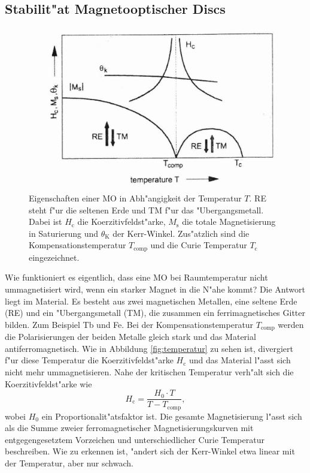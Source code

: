 \subsection{Stabilit"at Magnetooptischer Discs}
\begin{figure}[htbp]
    \begin{minipage}[t][][b]{0.48\textwidth}
        \centering
        \includegraphics[width=\textwidth]{../images/temperatur.png}
    \end{minipage}
    \hfill
    \begin{minipage}[t][][t]{0.48\textwidth}
        \caption{
            Eigenschaften einer MO in Abh"angigkeit der Temperatur $T$.
            RE steht f"ur die seltenen Erde und TM f"ur das "Ubergangsmetall.
            Dabei ist $H_\text{c}$ die Koerzitivfeldst"arke, $M_\text{s}$ die totale Magnetisierung in Saturierung und $\theta_\text{K}$ der Kerr-Winkel.
            Zus"atzlich sind die Kompensationstemperatur $T_\text{comp}$ und die Curie Temperatur $T_\text{c}$ eingezeichnet.
            \cite{roll}
            }
        \label{fig:temperatur}
    \end{minipage}
\end{figure}
Wie funktioniert es eigentlich, dass eine MO bei Raumtemperatur nicht ummagnetisiert wird, wenn ein starker Magnet in die N"ahe kommt?
Die Antwort liegt im Material.
Es besteht aus zwei magnetischen Metallen, eine seltene Erde (RE) und ein "Ubergangsmetall (TM), die zusammen ein ferrimagnetisches Gitter bilden.
Zum Beispiel Tb und Fe.
Bei der Kompensationstemperatur $T_\text{comp}$ werden die Polarisierungen der beiden Metalle gleich stark und das Material antiferromagnetisch.
Wie in Abbildung \vref{fig:temperatur} zu sehen ist, divergiert f"ur diese Temperatur die Koerzitivfeldst"arke $H_\text{c}$ und das Material l"asst sich nicht mehr ummagnetisieren.
Nahe der kritischen Temperatur verh"alt sich die Koerzitivfeldst"arke wie
\begin{equation}
H_\mathrm{c} = \frac{H_0 \cdot T}{T-T_\mathrm{comp}},
\label{eq:Hc}
\end{equation}
wobei $H_0$ ein Proportionalit"atsfaktor ist.
Die gesamte Magnetisierung l"asst sich als die Summe zweier ferromagnetischer Magnetisierungskurven mit entgegengesetztem Vorzeichen und unterschiedlicher Curie Temperatur beschreiben.
Wie zu erkennen ist, "andert sich der Kerr-Winkel etwa linear mit der Temperatur, aber nur schwach.

